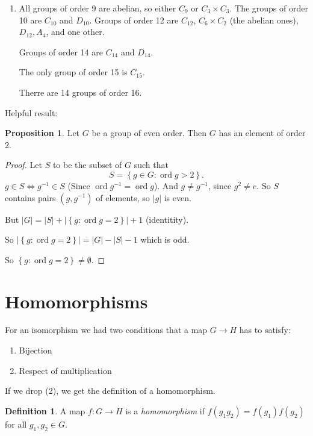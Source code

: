 \documentclass{article}
\theoremstyle{definition}
\newtheorem{definition}{Definition}
\newtheorem{proposition}{Proposition}
\DeclareMathOperator{\ord}{\text{ord}}
\begin{document}
\begin{enumerate}
\item All groups of order 9 are abelian, so either $C_9$ or $C_3 \times C_3$.
  The groups of order 10 are $C_{10}$ and $D_{10}$. Groups of order 12 are $C_{12}$, $ C_{6} \times C_2$ (the abelian ones), $D_{12},A_{4}$, and one other. 

  Groups of order 14 are $C_{14}$ and $D_{14}$. 

  The only group of order 15 is $C_{15}$.

  Therre are 14 groups of order 16.
\end{enumerate}

Helpful result:
\begin{proposition}
  Let $G$ be a group of even order. Then $G$ has an element of order 2.
\end{proposition}

\begin{proof}
  Let $S$ to be the subset of $G$ such that 
  \begin{equation*}
    S = \left\{ g \in G : \ord g > 2 \right\}.
  \end{equation*}
  $g \in S \iff g^{-1} \in S$ (Since $\ord g^{-1} = \ord g$). And $g \neq g^{-1}$, since $g^2 \neq e$. So $S$ contains pairs $(g,g^{-1})$ of elements, so $|g|$ is even. 

  But $|G|=|S| + |\left\{ g : \ord g=2 \right\}| + 1$ (identitity). 

  So $|\left\{ g : \ord g = 2 \right\}|=|G|-|S|-1$ which is odd. 

  So $\left\{ g : \ord g = 2 \right\} \neq \emptyset.$

\end{proof}


\section{Homomorphisms}

For an isomorphism we had two conditions that a map $G \rightarrow H$ has to satisfy:

\begin{enumerate}
  \item Bijection
  \item Respect of multiplication
\end{enumerate}

If we drop (2), we get the definition of a homomorphism.\\

\begin{definition}
  A map $f:G \rightarrow H$ is a \emph{homomorphism} if $f(g_1 g_2)=f(g_1)f(g_2)$ for all $g_1,g_2 \in G.$\\
\end{definition}
\end{document}
